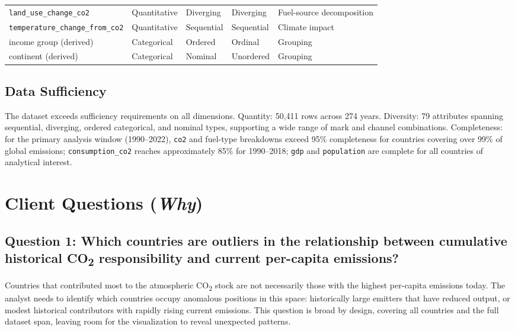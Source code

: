 \documentclass[10pt]{article}
\begin{document}
\begin{table}[h]
\begin{center}
\begin{tabular}{lllll}
\texttt{land\_use\_change\_co2}       & Quantitative & Diverging  & Diverging  & Fuel-source decomposition \\
\texttt{temperature\_change\_from\_co2}& Quantitative& Sequential & Sequential & Climate impact \\
income group (derived)                & Categorical  & Ordered   & Ordinal    & Grouping \\
continent (derived)                   & Categorical  & Nominal   & Unordered  & Grouping \\
\bottomrule
\end{tabular}
\end{center}
\end{table}

\subsection{Data Sufficiency}

The dataset exceeds sufficiency requirements on all dimensions. Quantity: 50{,}411 rows across 274 years. Diversity: 79 attributes spanning sequential, diverging, ordered categorical, and nominal types, supporting a wide range of mark and channel combinations. Completeness: for the primary analysis window (1990--2022), \texttt{co2} and fuel-type breakdowns exceed 95\% completeness for countries covering over 99\% of global emissions; \texttt{consumption\_co2} reaches approximately 85\% for 1990--2018; \texttt{gdp} and \texttt{population} are complete for all countries of analytical interest.

\section{Client Questions (\emph{Why})}
\label{sec:why}

\subsection{Question 1: Which countries are outliers in the relationship between cumulative historical CO\textsubscript{2} responsibility and current per-capita emissions?}

Countries that contributed most to the atmospheric CO\textsubscript{2} stock are not necessarily those with the highest per-capita emissions today. The analyst needs to identify which countries occupy anomalous positions in this space: historically large emitters that have reduced output, or modest historical contributors with rapidly rising current emissions. This question is broad by design, covering all countries and the full dataset span, leaving room for the visualization to reveal unexpected patterns.
\end{document}
